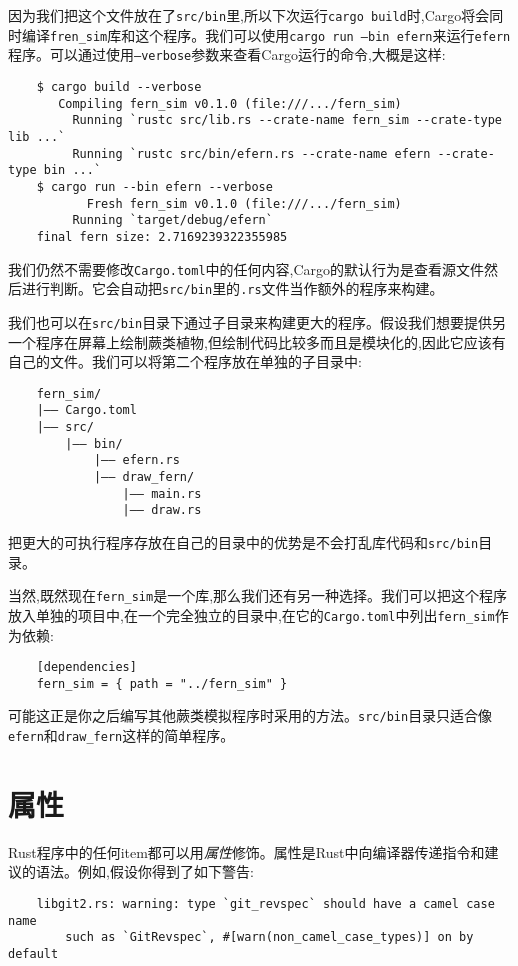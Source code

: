 因为我们把这个文件放在了\texttt{src/bin}里,所以下次运行\texttt{cargo build}时,Cargo将会同时编译\texttt{fren\_sim}库和这个程序。我们可以使用\texttt{cargo run --bin efern}来运行\texttt{efern}程序。可以通过使用\texttt{--verbose}参数来查看Cargo运行的命令,大概是这样:
\begin{verbatim}
    $ cargo build --verbose
       Compiling fern_sim v0.1.0 (file:///.../fern_sim)
         Running `rustc src/lib.rs --crate-name fern_sim --crate-type lib ...`
         Running `rustc src/bin/efern.rs --crate-name efern --crate-type bin ...`
    $ cargo run --bin efern --verbose
           Fresh fern_sim v0.1.0 (file:///.../fern_sim)
         Running `target/debug/efern`
    final fern size: 2.7169239322355985
\end{verbatim}

我们仍然不需要修改\texttt{Cargo.toml}中的任何内容,Cargo的默认行为是查看源文件然后进行判断。它会自动把\texttt{src/bin}里的\texttt{.rs}文件当作额外的程序来构建。

我们也可以在\texttt{src/bin}目录下通过子目录来构建更大的程序。假设我们想要提供另一个程序在屏幕上绘制蕨类植物,但绘制代码比较多而且是模块化的,因此它应该有自己的文件。我们可以将第二个程序放在单独的子目录中:
\begin{verbatim}
    fern_sim/
    |—— Cargo.toml
    |—— src/
        |—— bin/
            |—— efern.rs
            |—— draw_fern/
                |—— main.rs
                |—— draw.rs
\end{verbatim}

把更大的可执行程序存放在自己的目录中的优势是不会打乱库代码和\texttt{src/bin}目录。

当然,既然现在\texttt{fern\_sim}是一个库,那么我们还有另一种选择。我们可以把这个程序放入单独的项目中,在一个完全独立的目录中,在它的\texttt{Cargo.toml}中列出\texttt{fern\_sim}作为依赖:
\begin{verbatim}
    [dependencies]
    fern_sim = { path = "../fern_sim" }
\end{verbatim}

可能这正是你之后编写其他蕨类模拟程序时采用的方法。\texttt{src/bin}目录只适合像\texttt{efern}和\texttt{draw\_fern}这样的简单程序。

\section{属性}\label{attribute}

Rust程序中的任何item都可以用\emph{属性}修饰。属性是Rust中向编译器传递指令和建议的语法。例如,假设你得到了如下警告:
\begin{verbatim}
    libgit2.rs: warning: type `git_revspec` should have a camel case name
        such as `GitRevspec`, #[warn(non_camel_case_types)] on by default
\end{verbatim}

